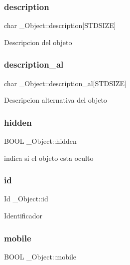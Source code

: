 \subsubsection{\texorpdfstring{description}{description}}
{\footnotesize\ttfamily char \+\_\+\+Object\+::description\mbox{[}S\+T\+D\+S\+I\+ZE\mbox{]}}

Descripcion del objeto \mbox{\label{struct__Object_ac438e34e4ae95415af05464dd0db29b8}} 
\subsubsection{\texorpdfstring{description\+\_\+al}{description\_al}}
{\footnotesize\ttfamily char \+\_\+\+Object\+::description\+\_\+al\mbox{[}S\+T\+D\+S\+I\+ZE\mbox{]}}

Descripcion alternativa del objeto \mbox{\label{struct__Object_a44824966fc9f4d5f82c189b2e063ddc4}} 
\subsubsection{\texorpdfstring{hidden}{hidden}}
{\footnotesize\ttfamily B\+O\+OL \+\_\+\+Object\+::hidden}

indica si el objeto esta oculto \mbox{\label{struct__Object_a3cff7a0e8dc4e9d23895ed9af1b7653a}} 
\subsubsection{\texorpdfstring{id}{id}}
{\footnotesize\ttfamily Id \+\_\+\+Object\+::id}

Identificador \mbox{\label{struct__Object_a95dd9ff00e5d341b5be3bc3a5bf1ee9a}} 
\subsubsection{\texorpdfstring{mobile}{mobile}}
{\footnotesize\ttfamily B\+O\+OL \+\_\+\+Object\+::mobile}

